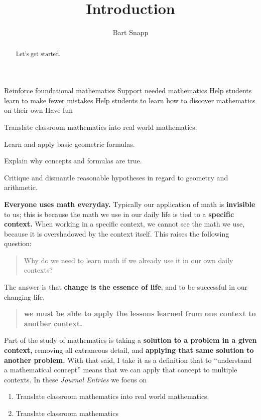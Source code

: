 \documentclass[handout,nooutcomes,noauthor]{ximera}
\title{Introduction}
\author{Bart Snapp}
\begin{document}
\begin{abstract}
  Let's get started.
\end{abstract}
\maketitle


Reinforce foundational mathematics
Support needed mathematics
Help students learn to make fewer mistakes
Help students to learn how to discover mathematics on their own
Have fun




\begin{listSectionOutcomes}
\item Translate classroom mathematics into real world mathematics. %
\item Learn and apply basic geometric formulas.
\item Explain why concepts and formulas are true.
\item Critique and dismantle reasonable hypotheses in regard to
  geometry and arithmetic.
\end{listSectionOutcomes}




\textbf{Everyone uses math everyday.}  Typically our application of
math is \textbf{invisible} to us; this is because the math we use in
our daily life is tied to a \textbf{specific context.} When working in
a specific context, we cannot see the math we use, because it is
overshadowed by the context itself.  This raises the following
question:
\begin{quote}
  Why do we need to learn math if we already use it in our own daily
  contexts?
\end{quote}
The answer is that \textbf{change is the essence of life}; and to be
successful in our changing life, 
\begin{quote}
  \textbf{we must be able to apply the lessons learned from one
    context to another context.}
\end{quote}
Part of the study of mathematics is taking a \textbf{solution to a
  problem in a given context,} removing all extraneous detail, and
\textbf{applying that same solution to another problem.} With that
said, I take it as a definition that to ``understand a mathematical
concept'' means that we can apply that concept to multiple contexts.
In these \textit{Journal Entries} we focus on
\begin{enumerate}
\item Translate classroom mathematics into real world mathematics.
\item Translate classroom mathematics 
\end{enumerate}
\end{document}
